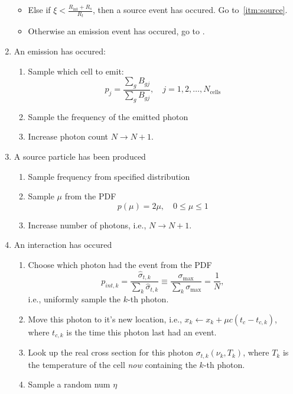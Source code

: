 \documentclass{article}
\newcommand{\ncl}{\ensuremath{N_{\text{cells}}}}
\newcommand{\Rin}{\ensuremath{R_{\text{int}}}}
\begin{document}
\begin{enumerate}
\begin{itemize}
\item Else if $\xi < \frac{\Rin+R_s}{R_t}$, then a source event has occured.
Go to~\ref{itm:source}.
\item Otherwise an emission event has occured, go to \label{itm:emission}.
\end{itemize}
\item \label{itm:emission} An emission has occured:
 \begin{enumerate}
    \item Sample which cell to emit:
     \begin{equation}
        p_j = \frac{\sum_{g} B_{gj}}{\sum_g B_{gj}}, \quad j=1,2,\ldots,\ncl
      \end{equation}
    \item Sample the frequency of the emitted photon
    \item Increase photon count $N\rightarrow N+1$.
  \end{enumerate}
\item \label{itm:source} A source particle has been produced
\begin{enumerate}
    \item Sample frequency from specified distribution
    \item Sample $\mu$ from the PDF
    \begin{equation}
      p(\mu) = 2\mu, \quad 0\leq\mu\leq 1
    \end{equation}
    \item Increase number of photons, i.e., $N\rightarrow N+1$.
\end{enumerate}
\item \label{itm:interaction} An interaction has occured
\begin{enumerate}
    \item Choose which photon had the event from the PDF
     \begin{equation}
      p_{int,k} = \frac{\hat\sigma_{t,k}}{\sum_{k} \hat\sigma_{t,k}} \equiv
\frac{\sigma_{\max}}{\sum_{k} \sigma_{\max}} = \frac{1}{N} ,
     \end{equation}
     i.e., uniformly sample the $k$-th photon.
    \item Move this photon to it's new location, i.e., $x_k \leftarrow x_k + \mu c
(t_c - t_{c,k})$, where $t_{c,k}$ is the time this photon last had an event.
    \item Look up the real cross section for this photon $\sigma_{t,k}(\nu_k,T_k)$,
where $T_k$ is the temperature of the cell \emph{now} containing the $k$-th photon.
    \item Sample a random num $\eta$

\end{enumerate}
\end{enumerate}
\end{document}
